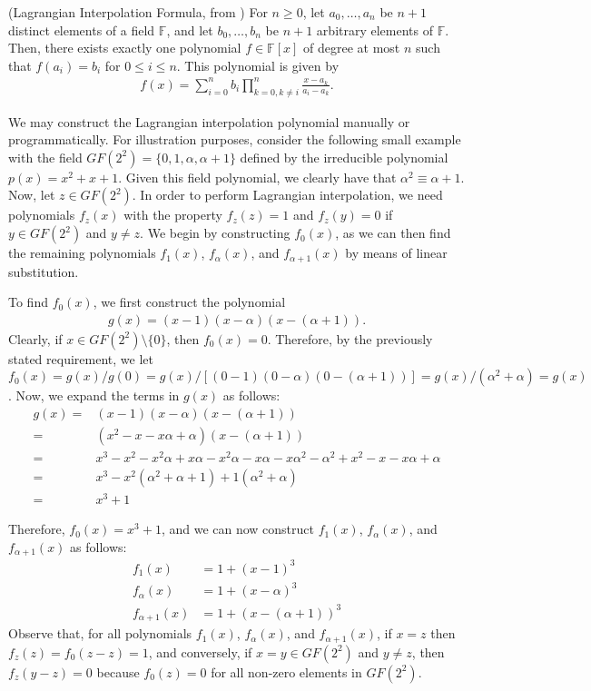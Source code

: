 \begin{thm}
(Lagrangian Interpolation Formula, from \cite{Lidl94-1}) For $n \geq 0$, let $a_0, \dots, a_n$ be $n + 1$ distinct elements of a field $\mathbb{F}$, and let $b_0, \dots, b_n$ be $n + 1$ arbitrary elements of $\mathbb{F}$. Then, there exists exactly one polynomial $f \in \mathbb{F}[x]$ of degree at most $n$ such that $f(a_i) = b_i$ for $0 \leq i \leq n$. This polynomial is given by 
\begin{align*}
f(x) = \sum_{i = 0}^{n}b_i\prod_{k = 0, k \not= i}^{n}\frac{x - a_k}{a_i - a_k}.
\end{align*}
\end{thm}

We may construct the Lagrangian interpolation polynomial manually or programmatically. For illustration purposes, consider the following small example with the field $GF(2^2) = \{0, 1, \alpha, \alpha + 1\}$ defined by the irreducible polynomial $p(x) = x^2 + x + 1$. Given this field polynomial, we clearly have that $\alpha^2 \equiv \alpha + 1$. Now, let $z \in GF(2^2)$. In order to perform Lagrangian interpolation, we need polynomials $f_z(x)$ with the property $f_z(z) = 1$ and $f_z(y) = 0$ if $y \in GF(2^2)$ and $y \not= z$. We begin by constructing $f_0(x)$, as we can then find the remaining polynomials $f_1(x)$, $f_{\alpha}(x)$, and $f_{\alpha+1}(x)$ by means of linear substitution. 

To find $f_0(x)$, we first construct the polynomial 
\begin{align*}
g(x) = (x-1)(x-\alpha)(x - (\alpha + 1)).
\end{align*}
Clearly, if $x \in GF(2^2) \setminus \{0\}$, then $f_0(x) = 0$. Therefore, by the previously stated requirement,
we let $f_0(x) = g(x)/g(0) = g(x) / [(0 - 1)(0 - \alpha)(0 - (\alpha+1))] = g(x) / (\alpha^2 + \alpha) = g(x)$.
Now, we expand the terms in $g(x)$ as follows:
\begin{align*}
g(x) = & (x-1)(x-\alpha)(x-(\alpha+1)) \\
= &  (x^2 - x - x\alpha + \alpha)(x - (\alpha + 1))\\
= & x^3 - x^2 -x^2\alpha + x\alpha - x^2\alpha - x\alpha - x\alpha^2 - \alpha^2 + x^2 - x - x\alpha + \alpha \\
= & x^3 - x^2(\alpha^2 + \alpha + 1) + 1(\alpha^2 + \alpha) \\
= & x^3 + 1
\end{align*}

Therefore, $f_0(x) = x^3 + 1$, and we can now construct $f_1(x)$, $f_{\alpha}(x)$, and $f_{\alpha+1}(x)$ as follows:
\begin{align*}
f_1(x) & =  1 + (x-1)^3\\
f_{\alpha}(x) &= 1 + (x - \alpha)^3\\
f_{\alpha+1}(x) &= 1 + (x - (\alpha + 1))^3
\end{align*}
Observe that, for all polynomials $f_1(x)$, $f_{\alpha}(x)$, and $f_{\alpha+1}(x)$, if $x = z$ then
$f_z(z) = f_0(z - z) = 1$, and conversely, if $x = y \in GF(2^2)$ and $y \not= z$, then $f_z(y - z) = 0$
because $f_0(z) = 0$ for all non-zero elements in $GF(2^2)$.

